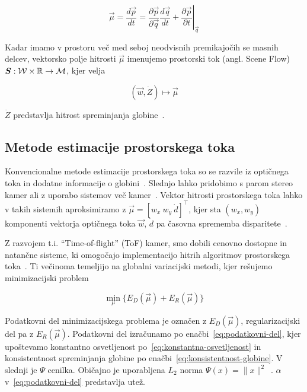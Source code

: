 \begin{equation}\label{eq:scene-flow}
	\vec{\mu} = \frac{d\vec{p}}{dt} = \frac{\partial \vec{p}}{\partial \vec{q}} \frac{d\vec{q}}{dt} + \left.\frac{\partial \vec{p}}{\partial t}\right|_{\vec{q}}
\end{equation}

Kadar imamo v prostoru več med seboj neodvisnih premikajočih se masnih delcev, vektorsko polje hitrosti $\vec{\mu}$ imenujemo prostorski tok (angl. Scene Flow) ${\boldsymbol{S}}: \mathcal{W} \times \mathbb{R} \to \mathcal{M}$, kjer velja

\begin{equation}
(\vec{w}, \dot{Z}) \mapsto \vec{\mu}
\label{eq:of-sf}
\end{equation}



$\dot{Z}$ predstavlja hitrost spreminjanja globine~\cite{yan2016scene}.

\subsection{Metode estimacije prostorskega toka}
Konvencionalne metode estimacije prostorskega toka so se razvile iz optičnega toka in dodatne informacije o globini~\cite{yan2016scene}. Slednjo lahko pridobimo s parom stereo kamer ali z uporabo sistemov več kamer~\cite{jaimez2015primal}. Vektor hitrosti prostorskega toka lahko v takih sistemih aproksimiramo z $\vec{\mu} = \left[w_x~w_y~\dot{d}\right]^\top$, kjer sta $(w_x, w_y)$ komponenti vektorja optičnega toka $\vec{w}$, $\dot{d}$ pa časovna sprememba disparitete~\cite{yan2016scene}.

Z razvojem t.i. ``Time-of-flight'' (ToF) kamer, smo dobili cenovno dostopne in natančne sisteme, ki omogočajo implementacijo hitrih algoritmov prostorskega toka~\cite{yan2016scene,jaimez2015primal}. Ti večinoma temeljijo na globalni variacijski metodi, kjer rešujemo minimizacijski problem 

\begin{equation}\label{eq:minimizacijski-problem}
	\min_{\mu}\{E_D(\vec{\mu}) + E_R(\vec{\mu})\}
\end{equation}

Podatkovni del minimizacijskega problema je označen z $E_D(\vec{\mu})$, regularizacijski del pa z  $E_R(\vec{\mu})$. Podatkovni del izračunamo po enačbi~\eqref{eq:podatkovni-del}, kjer upoštevamo konstantno osvetljenost po~\eqref{eq:konstantna-osvetljenost} in konsistentnost spreminjanja globine po enačbi~\eqref{eq:konsistentnost-globine}. V slednji je  $\Psi$ cenilka. Običajno je uporabljena $L_2$ norma $\Psi(x) = \| x \|^2$~\cite{yan2016scene}. $\alpha$ v~\eqref{eq:podatkovni-del} predstavlja utež.

